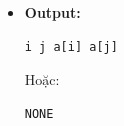 \begin{itemize}
\begin{itemize}
        \item \textbf{Module 3 (Ghi file):}
        \begin{itemize}
            \item Mỗi cặp ghi:
\begin{lstlisting}
i j a[i] a[j]
\end{lstlisting}
            \item Nếu không có cặp nào ghi \texttt{NONE}
        \end{itemize}
    \end{itemize}

    \item \textbf{Output:}
\begin{lstlisting}
i j a[i] a[j]
\end{lstlisting}
Hoặc:
\begin{lstlisting}
NONE
\end{lstlisting}
\end{itemize}

